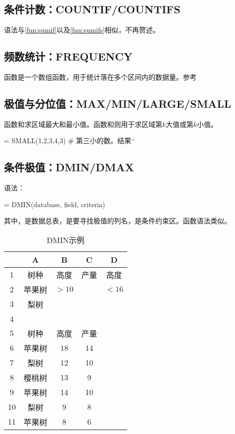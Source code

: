\subsection{条件计数：COUNTIF/COUNTIFS}
语法与\autoref{fun:sumif}以及\autoref{fun:sumifs}相似，不再赘述。

\subsection{频数统计：FREQUENCY}
函数是一个数组函数，用于统计落在多个区间内的数据量。参考

\subsection{极值与分位值：MAX/MIN/LARGE/SMALL}
函数和求区域最大和最小值。函数和则用于求区域第$k$大值或第$k$小值。

\begin{excode}
= SMALL({1,2,3,4},3)  # 第三小的数。结果``
\end{excode}

\subsection{条件极值：DMIN/DMAX}
语法：
\begin{syntax}
= DMIN(database, field, criteria)
\end{syntax}

其中，是数据总表，是要寻找极值的列名，是条件约束区。函数语法类似。

\begin{table}[!hbt]
    \centering
    \caption{DMIN示例}\label{tab:dmin}
    \begin{tabular}{c|cccc}
    \hline
      & A & B & C & D \\
    \hline
    1 & 树种 & 高度 & 产量 & 高度 \\
    2 & 苹果树 & $>10$ & & $<16$ \\
    3 & 梨树 & \\
    4 & \\
    5 & 树种 & 高度 & 产量 &  \\
    6 & 苹果树 & 18 & 14 \\
    7 & 梨树 & 12 & 10 \\
    8 & 樱桃树 & 13 & 9 \\
    9 & 苹果树 & 14 & 10 \\
    10 & 梨树 & 9 & 8 \\
    11 & 苹果树 & 8 & 6 \\
    \hline
    \end{tabular}
\end{table}

